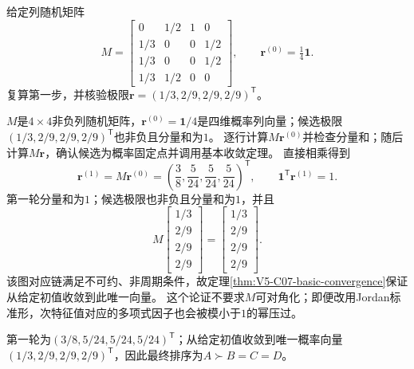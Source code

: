 \label{struct:V5-C07-CH32}
\begin{example}\label{exm:V5-C07-basic-four}
给定列随机矩阵
\[
M=\begin{bmatrix}
0&1/2&1&0\\1/3&0&0&1/2\\1/3&0&0&1/2\\1/3&1/2&0&0
\end{bmatrix},
\qquad \boldsymbol r^{(0)}=\tfrac14\boldsymbol1.
\]
复算第一步，并核验极限$\boldsymbol r=(1/3,2/9,2/9,2/9)^{\mathsf T}$。
\end{example}
\begin{solution}
\SolGiven $M$是$4\times4$非负列随机矩阵，$\boldsymbol r^{(0)}=\boldsymbol1/4$是四维概率列向量；候选极限$(1/3,2/9,2/9,2/9)^{\mathsf T}$也非负且分量和为$1$。
\SolPlan 逐行计算$M\boldsymbol r^{(0)}$并检查分量和；随后计算$M\boldsymbol r$，确认候选为概率固定点并调用基本收敛定理。
\SolDerive 直接相乘得到
\[
\boldsymbol r^{(1)}=M\boldsymbol r^{(0)}
=\left(\frac38,\frac5{24},\frac5{24},\frac5{24}\right)^{\mathsf T},
\qquad
\boldsymbol1^{\mathsf T}\boldsymbol r^{(1)}=1.
\]
\SolCheck 第一轮分量和为$1$；候选极限也非负且分量和为$1$，并且
\[
M\begin{bmatrix}1/3\\2/9\\2/9\\2/9\end{bmatrix}
=\begin{bmatrix}1/3\\2/9\\2/9\\2/9\end{bmatrix}.
\]
该图对应链满足不可约、非周期条件，故定理\ref{thm:V5-C07-basic-convergence}保证从给定初值收敛到此唯一向量。
这个论证不要求$M$可对角化；即便改用Jordan标准形，次特征值对应的多项式因子也会被模小于$1$的幂压过。

\SolAnswer 第一轮为$(3/8,5/24,5/24,5/24)^{\mathsf T}$；从给定初值收敛到唯一概率向量$(1/3,2/9,2/9,2/9)^{\mathsf T}$，因此最终排序为$A\succ B=C=D$。
\end{solution}

